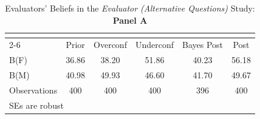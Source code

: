 \begin{table}[htbp]\centering
\caption{Evaluators' Beliefs in the \textit{Evaluator (Alternative Questions)} Study: \textbf{Panel A}}
\begin{tabular}{l*{5}{c}}
\hline\hline
                &\multicolumn{5}{c}{}                             \\\cmidrule(lr){2-6}
                &\multicolumn{1}{c}{Prior}&\multicolumn{1}{c}{Overconf}&\multicolumn{1}{c}{Underconf}&\multicolumn{1}{c}{Bayes Post}&\multicolumn{1}{c}{Post}\\
\hline
B(F)            &    36.86&    38.20&    51.86&    40.23&    56.18\\
B(M)            &    40.98&    49.93&    46.60&    41.70&    49.67\\
\hline
Observations    &      400&      400&      400&      396&      400\\
\hline\hline
\multicolumn{6}{l}{\footnotesize SEs are robust}\\
\end{tabular}
\end{table}
